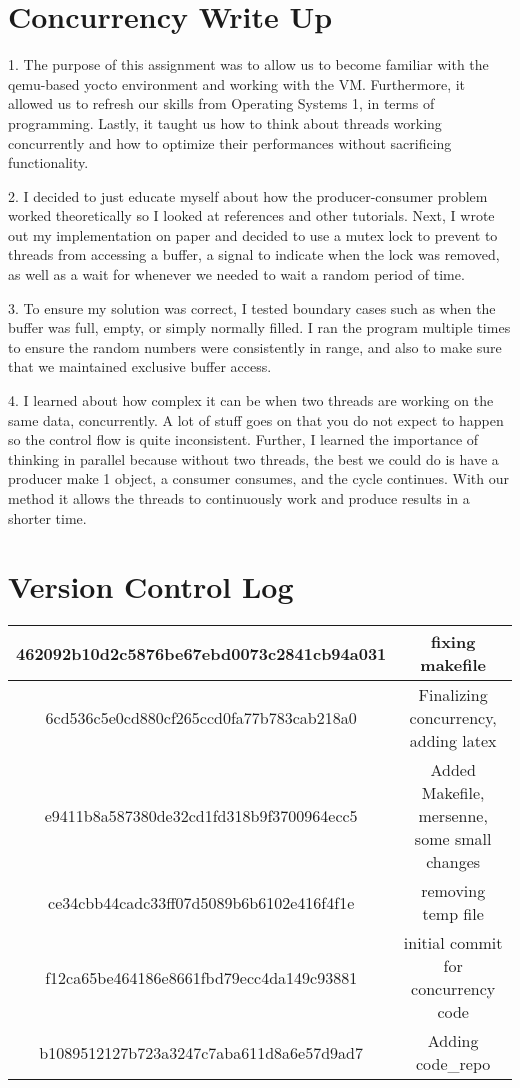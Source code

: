 \documentclass[onecolumn, draftclsnofoot,10pt, compsoc]{IEEEtran}
\begin{document}
\section{Concurrency Write Up}
	1. The purpose of this assignment was to allow us to become familiar with the
qemu-based yocto environment and working with the VM. Furthermore, it allowed us
 to refresh our skills from Operating Systems 1, in terms of programming.
  Lastly, it taught us how to think about threads working concurrently and
	 how to optimize their performances without sacrificing functionality.

2. I decided to just educate myself about how the producer-consumer problem
worked theoretically so I looked at references and other tutorials. Next, I wrote
out my implementation on paper and decided to use a mutex lock to prevent to threads
 from accessing a buffer, a signal to indicate when the lock was removed, as well as
  a wait for whenever we needed to wait a random period of time.

3. To ensure my solution was correct, I tested boundary cases such as when the
 buffer was full, empty, or simply normally filled. I ran the program multiple times to ensure the random numbers were consistently in range, and also to make sure that we maintained exclusive buffer access.

4. I learned about how complex it can be when two threads are working on the same
data, concurrently. A lot of stuff goes on that you do not expect to happen so the
 control flow is quite inconsistent. Further, I learned the importance of thinking
 in parallel because without two threads, the best we could do is have a producer
  make 1 object, a consumer consumes, and the cycle continues. With our method it
	allows the threads to continuously work and produce results in a shorter time.


\section{Version Control Log}

\begin{tabular}{ c | c }
	\hline
	462092b10d2c5876be67ebd0073c2841cb94a031 &  fixing makefile \\
	\hline
	6cd536c5e0cd880cf265ccd0fa77b783cab218a0 &   Finalizing concurrency, adding latex \\
	\hline
	e9411b8a587380de32cd1fd318b9f3700964ecc5 &	Added Makefile, mersenne, some small changes \\
  \hline
  ce34cbb44cadc33ff07d5089b6b6102e416f4f1e &  removing temp file \\
	\hline
  f12ca65be464186e8661fbd79ecc4da149c93881 & initial commit for concurrency code \\
	\hline
  b1089512127b723a3247c7aba611d8a6e57d9ad7 &  Adding code\_repo \\
  \hline
\end{tabular}
\end{document}
